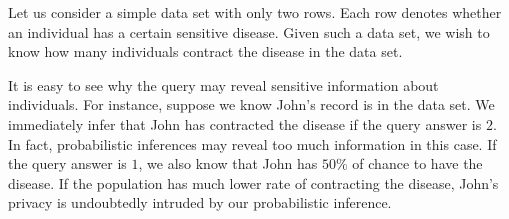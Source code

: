 
Let us consider a simple data set with only two rows. Each row denotes
whether an individual has a certain sensitive disease. Given such a
data set, we wish to know how many individuals contract the disease in
the data set.

It is easy to see why the query may reveal sensitive information about
individuals. For instance, suppose we know John's record is in the
data set. We immediately infer that John has contracted the disease if
the query answer is $2$. In fact, probabilistic inferences may reveal
too much information in this case. If the query answer is $1$, we also
know that John has $50\%$ of chance to have the disease. If the
population has much lower rate of contracting the disease, John's
privacy is undoubtedly intruded by our probabilistic inference.

\begin{figure}
  \centering
\end{figure}
